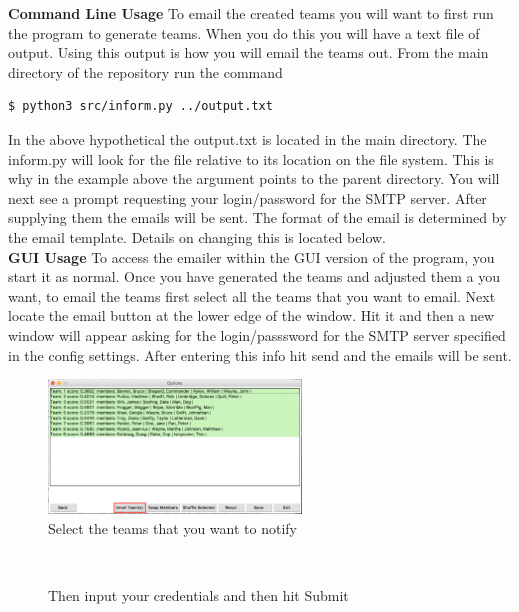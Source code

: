 \documentclass[10pt]{article}
\begin{document}
\begin{enumerate}
\newline
\large
\textbf{Command Line Usage}
\normalsize
\newline
To email the created teams you will want to first run the program to generate teams. When you do this you will have a text file of output. Using this output is how you will email the teams out. From the main directory of the repository run the command
\begin{lstlisting}
$ python3 src/inform.py ../output.txt
\end{lstlisting}
In the above hypothetical the output.txt is located in the main directory. The inform.py will look for the file relative to its location on the file system. This is why in the example above the argument points to the parent directory.
\newline
\newline
You will next see a prompt requesting your login/password for the SMTP server. After supplying them the emails will be sent. The format of the email is determined by the email template. Details on changing this is located below.\\
\newline
\large
\textbf{GUI Usage}
\normalsize
\newline
To access the emailer within the GUI version of the program, you start it as normal. Once you have generated the teams and adjusted them a you want, to email the teams first select all the teams that you want to email. Next locate the email button at the lower edge of the window. Hit it and then a new window will appear asking for the login/passsword for the SMTP server specified in the config settings. After entering this info hit send and the emails will be sent. 
\begin{figure}[h]
\caption{Select the teams that you want to notify}
\centering
\includegraphics[width=0.6\textwidth]{pic22}
\end{figure}\\
\newpage
\begin{figure}[h]
\caption{Then input your credentials and then hit Submit}
\centering

\end{figure}
\end{enumerate}
\end{document}
